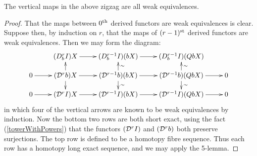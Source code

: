 \documentclass[10pt]{article}
\begin{document}
\begin{convergence}
\begin{prop}\label{verticalsEquivsInDvCALD}
The vertical maps in the above zigzag are all weak equivalences.
\end{prop}
\begin{proof}
That the maps between $0^\textup{th}$ derived functors are weak equivalences is clear. Suppose then, by induction on $r$, that the maps of $(r-1)^\textup{st}$ derived functors are weak equivalences. Then we may form the diagram:
\[\xymatrix@R=4mm{
&
(\dupdown{r}{b}I)X\ar[r]&
(\dupdown{r-1}{b}I)(bX)\ar[r]&
(\dupdown{r-1}{b}I)(QbX)&
\\
0\ar[r]&
(\caldup{r}b)X\ar[d]\ar[u]\ar[r]&
(\caldup{r-1}b)(bX)\ar[d]^{\sim}\ar[u]_{\sim}\ar[r]&
(\caldup{r-1}b)(QbX)\ar[d]^{\sim}\ar[u]_{\sim}\ar[r]&
0\\
0\ar[r]&
(\caldup{r}I)X\ar[r]&
(\caldup{r-1}I)(bX)\ar[r]&
(\caldup{r-1}I)(QbX)\ar[r]&
0
}\]
in which four of the vertical arrows are known to be weak equivalences by induction.
Now the bottom two rows are both short exact, using the fact (\ref{towerWithPowers}) that the functors $(\mathcal{D}^{\smash{r}}I)$ and $(\mathcal{D}^{\smash{r}}b)$ both preserve surjections. The top row is defined to be a homotopy fibre sequence. Thus each row has a homotopy long exact sequence, and we may apply the 5-lemma.
\end{proof}












\end{convergence}
\end{document}
